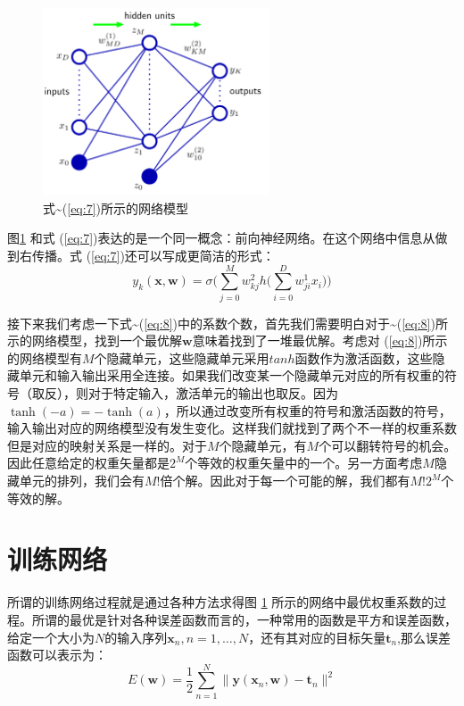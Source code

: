 \documentclass[10pt,a4paper,UTF8]{article}
\begin{document}
\begin{figure}[htbp]
\centering
\includegraphics[width=0.6\textwidth]{../../img/computer_prml/20170702neuralnetwork.png}
\caption{\label{fig:org59331b5}
式\textasciitilde{}(\ref{eq:7})所示的网络模型}
\end{figure}

图\ref{fig:org59331b5} 和式 (\ref{eq:7})表达的是一个同一概念：前向神经网络。在这个网络中信息从做到右传播。式 (\ref{eq:7})还可以写成更简洁的形式：
\begin{equation}
\label{eq:8}
y_{k}(\mathbf{x},\mathbf{w}) = \sigma \bigg( \sum_{j=0}^{M}w_{kj}^{2} h\bigg(\sum_{i=0}^{D}w_{ji}^{1}x_{i}  \bigg) \bigg)
\end{equation}

接下来我们考虑一下式\textasciitilde{}(\ref{eq:8})中的系数个数，首先我们需要明白对于\textasciitilde{}(\ref{eq:8})所示的网络模型，找到一个最优解\(\mathbf{w}\)意味着找到了一堆最优解。考虑对 (\ref{eq:8})所示的网络模型有\(M\)个隐藏单元，这些隐藏单元采用\(tanh\)函数作为激活函数，这些隐藏单元和输入输出采用全连接。如果我们改变某一个隐藏单元对应的所有权重的符号（取反），则对于特定输入，激活单元的输出也取反。因为\(\tanh(-a) = -\tanh(a)\)，所以通过改变所有权重的符号和激活函数的符号，输入输出对应的网络模型没有发生变化。这样我们就找到了两个不一样的权重系数但是对应的映射关系是一样的。对于\(M\)个隐藏单元，有\(M\)个可以翻转符号的机会。因此任意给定的权重矢量都是\(2^{M}\)个等效的权重矢量中的一个。另一方面考虑\(M\)隐藏单元的排列，我们会有\(M!\)倍个解。因此对于每一个可能的解，我们都有\(M!2^{M}\)个等效的解。

\section{训练网络}
\label{sec:org5f86570}


所谓的训练网络过程就是通过各种方法求得图 \ref{fig:org59331b5} 所示的网络中最优权重系数的过程。所谓的最优是针对各种误差函数而言的，一种常用的函数是平方和误差函数，给定一个大小为\(N\)的输入序列\(\mathbf{x}_{n},n=1,\ldots ,N\)，还有其对应的目标矢量\(\mathbf{t}_{n}\),那么误差函数可以表示为：
\begin{equation}
\label{eq:9}
E(\mathbf{w}) = \frac{1}{2}\sum_{n=1}^{N} \| \mathbf{y} ( \mathbf{x}_{n},\mathbf{w}) - \mathbf{t}_{n} \|^{2}
\end{equation}
\end{document}
